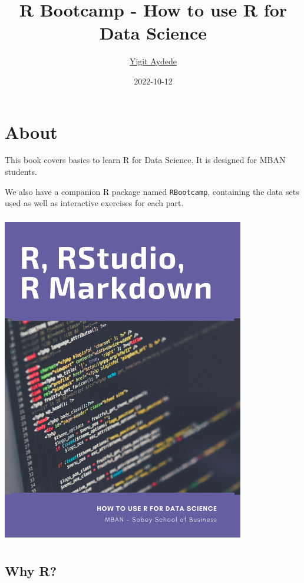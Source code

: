 \documentclass[
]{book}
\title{R Bootcamp - How to use R for Data Science}
\author{\href{https://yaydede.github.io/}{Yigit Aydede}}
\date{2022-10-12}
\theoremstyle{definition}
\theoremstyle{definition}
\theoremstyle{definition}
\theoremstyle{definition}
\theoremstyle{remark}
\begin{document}
\maketitle

{
\hypersetup{linkcolor=}
\setcounter{tocdepth}{1}
\tableofcontents
}
\hypertarget{about}{%
\chapter*{About}\label{about}}

This book covers basics to learn R for Data Science. It is designed for MBAN students.

We also have a companion R package named \texttt{RBootcamp}, containing the data sets used as well as interactive exercises for each part.

\includegraphics[width=4.16667in,height=5.72917in]{png/cover.png}

\hypertarget{why-r}{%
\section*{Why R?}\label{why-r}}
\end{document}

